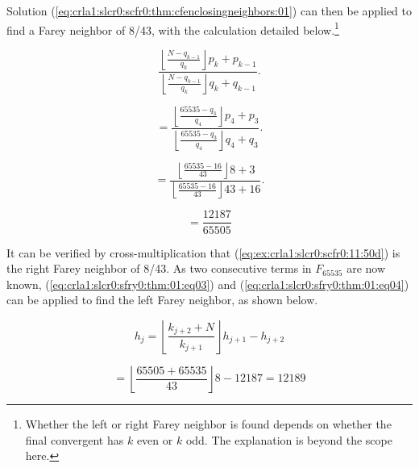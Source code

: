 \begin{vworkexampleparsection}{Solution}
(\ref{eq:crla1:slcr0:scfr0:thm:cfenclosingneighbors:01}) can then be applied
to find a Farey neighbor of 8/43, with the calculation
detailed below.\footnote{Whether the left or right Farey neighbor is found depends on
whether the final convergent has $k$ even or $k$ odd.  The explanation is beyond the scope here.}

\begin{equation}
\label{eq:ex:crla1:slcr0:scfr0:11:50a}
\frac{{\displaystyle{\left\lfloor {\frac{{N - q_{k - 1} }}{{q_k }}} \right\rfloor}
 p_k  + p_{k - 1} }}{{\displaystyle{\left\lfloor {\frac{{N - q_{k - 1} }}{{q_k }}}
 \right\rfloor} q_k  + q_{k - 1} }}.
\end{equation}

\begin{equation}
\label{eq:ex:crla1:slcr0:scfr0:11:50b}
= \frac{{\displaystyle{\left\lfloor {\frac{{65535 - q_{3} }}{{q_{4} }}} \right\rfloor}
 p_{4}  + p_{3} }}{{\displaystyle{\left\lfloor {\frac{{65535 - q_{3} }}{{q_{4} }}}
 \right\rfloor} q_{4}  + q_{3} }}.
\end{equation}

\begin{equation}
\label{eq:ex:crla1:slcr0:scfr0:11:50c}
= \frac{{\displaystyle{\left\lfloor {\frac{{65535 - 16 }}{{43 }}} \right\rfloor}
 8  + 3 }}{{\displaystyle{\left\lfloor {\frac{{65535 - 16 }}{{43 }}}
 \right\rfloor} 43  + 16 }}.
\end{equation}

\begin{equation}
\label{eq:ex:crla1:slcr0:scfr0:11:50d}
= \frac{12187}{65505}
\end{equation}

It can be verified by cross-multiplication that (\ref{eq:ex:crla1:slcr0:scfr0:11:50d})
is the right Farey neighbor of 8/43.  As two consecutive
terms in $F_{65535}$ are now known, (\ref{eq:crla1:slcr0:sfry0:thm:01:eq03})
and (\ref{eq:crla1:slcr0:sfry0:thm:01:eq04}) can be applied to find the left Farey
neighbor, as shown below.

\begin{equation}
\label{eq:ex:crla1:slcr0:scfr0:11:51}
h_j  = \left\lfloor {\frac{{k_{j + 2}  + N}}{{k_{j + 1} }}} 
\right\rfloor h_{j + 1}  - h_{j + 2}
\end{equation}

\begin{equation}
\label{eq:ex:crla1:slcr0:scfr0:11:52}
= \left\lfloor {\frac{{65505  + 65535}}{{43 }}} 
\right\rfloor 8  - 12187 = 12189
\end{equation}


\end{vworkexampleparsection}
